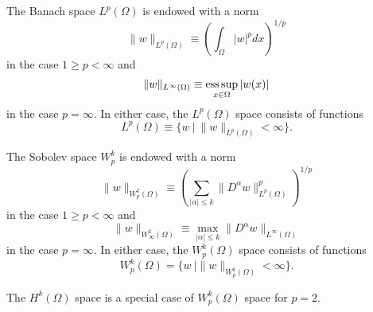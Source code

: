 \begin{definition}
  The Banach space $L^p(\Omega)$ is endowed with a norm
  \begin{equation*}
    \| w \|_{L^p(\Omega)} \equiv \left(\int_\Omega |w|^p dx\right)^{1/p}
  \end{equation*}
  in the case $1 \geq p < \infty$ and
  \begin{equation*}
    \| w \|_{L^\infty(\Omega)} \equiv \operatorname*{ess\,sup}_{x \in \Omega} | w(x) | 
  \end{equation*}
  in the case $p = \infty$.   In either case, the $L^p(\Omega)$ space consists of functions
  \begin{equation*}
    L^p(\Omega) \equiv \{ w \ | \ \| w \|_{L^p(\Omega)} < \infty \}.
  \end{equation*}
\end{definition}
\begin{definition}[$W^k_p$ space]
  The Sobolev space $W^k_p$ is endowed with a norm
  \begin{equation*}
    \| w \|_{W^k_p(\Omega)} \equiv \left( \sum_{|\alpha|\leq k} \| D^\alpha w \|^p_{L^p(\Omega)} \right)^{1/p}
  \end{equation*}
  in the case $1 \geq p < \infty$ and
  \begin{equation*}
    \| w \|_{W^k_\infty(\Omega)} \equiv \max_{|\alpha| \leq k} \| D^\alpha w \|_{L^\infty(\Omega)}
  \end{equation*}
  in the case $p = \infty$. In either case, the $W^k_p(\Omega)$ space consists of functions
  \begin{equation*}
    W^k_p(\Omega) = \{ w \ | \| w \|_{W^k_p(\Omega)} < \infty \}.
  \end{equation*}
\end{definition}
\begin{remark}
  The $H^k(\Omega)$ space is a special case of $W^k_p(\Omega)$ space for $p = 2$.
\end{remark}




